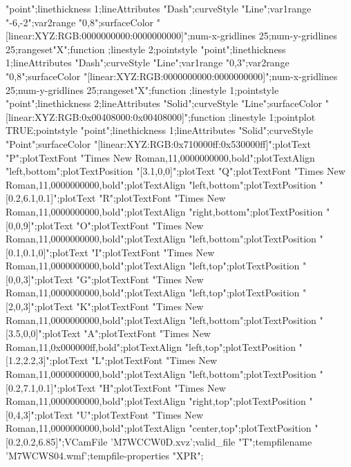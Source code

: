 \documentclass{article}
\begin{document}
{{"point";linethickness 1;lineAttributes "Dash";curveStyle "Line";var1range
"-6,-2";var2range "0,8";surfaceColor
"[linear:XYZ:RGB:0000000000:0000000000]";num-x-gridlines 25;num-y-gridlines
25;rangeset"X";function ;linestyle
2;pointstyle "point";linethickness 1;lineAttributes "Dash";curveStyle
"Line";var1range "0,3";var2range "0,8";surfaceColor
"[linear:XYZ:RGB:0000000000:0000000000]";num-x-gridlines 25;num-y-gridlines
25;rangeset"X";function
;linestyle 1;pointstyle "point";linethickness
2;lineAttributes "Solid";curveStyle "Line";surfaceColor
"[linear:XYZ:RGB:0x00408000:0x00408000]";function ;linestyle 1;pointplot TRUE;pointstyle "point";linethickness
1;lineAttributes "Solid";curveStyle "Point";surfaceColor
"[linear:XYZ:RGB:0x710000ff:0x530000ff]";plotText "P";plotTextFont "Times
New Roman,11,0000000000,bold";plotTextAlign "left,bottom";plotTextPosition
"[3.1,0,0]";plotText "Q";plotTextFont "Times New
Roman,11,0000000000,bold";plotTextAlign "left,bottom";plotTextPosition
"[0.2,6.1,0.1]";plotText "R";plotTextFont "Times New
Roman,11,0000000000,bold";plotTextAlign "right,bottom";plotTextPosition
"[0,0,9]";plotText "O";plotTextFont "Times New
Roman,11,0000000000,bold";plotTextAlign "left,bottom";plotTextPosition
"[0.1,0.1,0]";plotText "I";plotTextFont "Times New
Roman,11,0000000000,bold";plotTextAlign "left,top";plotTextPosition
"[0,0,3]";plotText "G";plotTextFont "Times New
Roman,11,0000000000,bold";plotTextAlign "left,top";plotTextPosition
"[2,0,3]";plotText "K";plotTextFont "Times New
Roman,11,0000000000,bold";plotTextAlign "left,bottom";plotTextPosition
"[3.5,0,0]";plotText "A";plotTextFont "Times New
Roman,11,0x000000ff,bold";plotTextAlign "left,top";plotTextPosition
"[1.2,2.2,3]";plotText "L";plotTextFont "Times New
Roman,11,0000000000,bold";plotTextAlign "left,bottom";plotTextPosition
"[0.2,7.1,0.1]";plotText "H";plotTextFont "Times New
Roman,11,0000000000,bold";plotTextAlign "right,top";plotTextPosition
"[0,4,3]";plotText "U";plotTextFont "Times New
Roman,11,0000000000,bold";plotTextAlign "center,top";plotTextPosition
"[0.2,0.2,6.85]";VCamFile 'M7WCCW0D.xvz';valid_file "T";tempfilename
'M7WCWS04.wmf';tempfile-properties "XPR";}}
\end{document}
